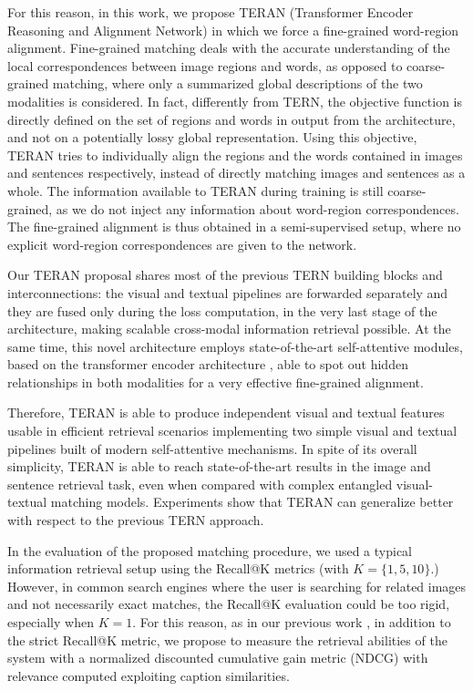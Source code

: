\documentclass[acmsmall]{acmart}
\newcommand{\majorrevised}[1]{#1}
\begin{document}
\majorrevised{For this reason, in this work, we propose TERAN (Transformer Encoder Reasoning and Alignment Network) in which we force a fine-grained word-region alignment. Fine-grained matching deals with the accurate understanding of the local correspondences between image regions and words, as opposed to coarse-grained matching, where only a summarized global descriptions of the two modalities is considered.
In fact, differently from TERN, the objective function is directly defined on the set of regions and words in output from the architecture, and not on a potentially lossy global representation. Using this objective, TERAN tries to individually align the regions and the words contained in images and sentences respectively, instead of directly matching images and sentences as a whole. The information available to TERAN during training is still coarse-grained, as we do not inject any information about word-region correspondences. The fine-grained alignment is thus obtained in a semi-supervised setup, where no explicit word-region correspondences are given to the network.}









Our TERAN proposal shares most of the previous TERN building blocks and interconnections: the visual and textual pipelines are forwarded separately and they are fused only during the loss computation, in the very last stage of the architecture, making scalable cross-modal information retrieval possible. At the same time, this novel architecture employs state-of-the-art self-attentive modules, based on the transformer encoder architecture \cite{vaswani2017transformer}, able to spot out hidden relationships in both modalities for a very effective fine-grained alignment. 



\majorrevised{Therefore, TERAN is able to produce independent visual and textual features usable in efficient retrieval scenarios implementing two simple visual and textual pipelines built of modern self-attentive mechanisms. In spite of its overall simplicity, TERAN is able to reach state-of-the-art results in the image and sentence retrieval task, even when compared with complex entangled visual-textual matching models. Experiments show that TERAN can generalize better with respect to the previous TERN approach.}

In the evaluation of the proposed matching procedure, we used a typical information retrieval setup using the Recall@K metrics (with $K = \{1, 5, 10\}$.)
However, in common search engines where the user is searching for related images and not necessarily exact matches, the Recall@K evaluation could be too rigid, especially when $K = 1$.
For this reason, as in our previous work \cite{messina2020tern}, in addition to the strict Recall@K metric, we propose to measure the retrieval abilities of the system with a normalized discounted cumulative gain metric (NDCG) with relevance computed exploiting caption similarities.
\end{document}
